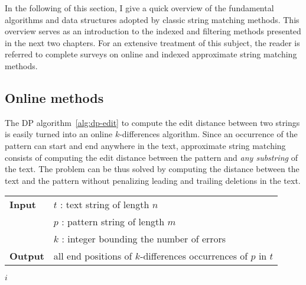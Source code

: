 In the following of this section, I give a quick overview of the fundamental algorithms and data structures adopted by classic string matching methods.
This overview serves as an introduction to the indexed and filtering methods presented in the next two chapters.
For an extensive treatment of this subject, the reader is referred to complete surveys on online \citep{Navarro2001a} and indexed \citep{Navarro2001} approximate string matching methods.


\subsection{Online methods}
\label{sub:introonline}



The DP algorithm~\ref{alg:dp-edit} to compute the edit distance between two strings is easily turned into an online $k$-differences algorithm.
Since an occurrence of the pattern can start and end anywhere in the text, approximate string matching consists of computing the edit distance between the pattern and \emph{any substring} of the text.
The problem can be thus solved by computing the distance between the text and the pattern without penalizing leading and trailing deletions in the text.

\begin{figure*}[h]
\begin{center}
\begin{minipage}[t]{.9\textwidth}
\begin{algorithm}[H]
\begin{tabular}{ll}
\textbf{Input}  & $t$ : text string of length $n$\\
				& $p$ : pattern string of length $m$\\
				& $k$ : integer bounding the number of errors\\
\textbf{Output} & all end positions of $k$-differences occurrences of $p$ in $t$\\
\end{tabular}
\begin{algorithmic}[1]
\EndFor
{}
	\EndFor
		\State \Report $i$
	\EndIf
\EndFor
\end{algorithmic}
\label{alg:dp-kdiff}
\end{algorithm}
\end{minipage}
\end{center}
\end{figure*}

